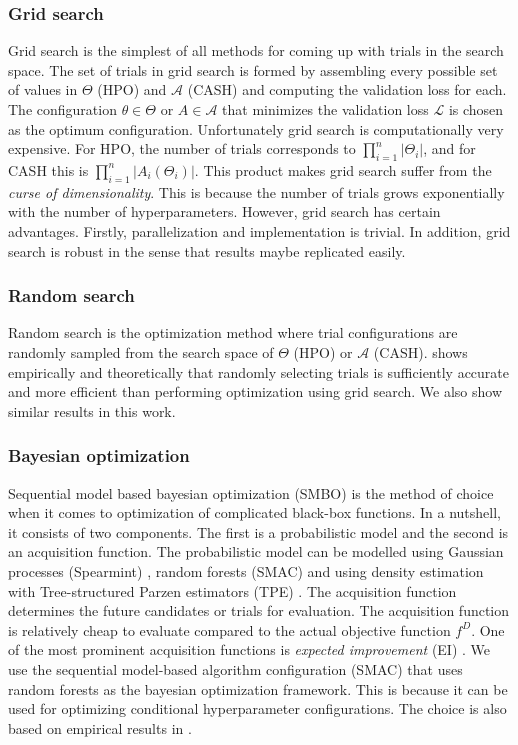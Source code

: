 \subsubsection{Grid search}
\label{grid}
Grid search is the simplest of all methods for coming up with trials in the search space. The set of trials in grid search is formed by assembling every possible set of values in $\Theta$ (HPO) and $\mathcal{A}$ (CASH) and computing the validation loss for each. The configuration $\theta \in \Theta$ or $A \in \mathcal{A}$ that minimizes the validation loss $\mathcal{L}$ is chosen as the optimum configuration. Unfortunately grid search is computationally very expensive. For HPO, the number of trials corresponds to $\prod_{i=1}^n |\Theta_i|$, and for CASH this is $\prod_{i=1}^n |A_i(\Theta_i)|$. This product makes grid search suffer from the \textit{curse of dimensionality}. This is because the number of trials grows exponentially with the number of hyperparameters. However, grid search has certain advantages. Firstly, parallelization and implementation is trivial. In addition, grid search is robust in the sense that results maybe replicated easily. 

\subsubsection{Random search}
\label{random}
Random search is the optimization method where trial configurations are randomly sampled from the search space of $\Theta$ (HPO) or $\mathcal{A}$ (CASH). \cite{bergstra2012random} shows empirically and theoretically that randomly selecting trials is sufficiently accurate and more efficient than performing optimization using grid search. We also show similar results in this work.

\subsubsection{Bayesian optimization}
\label{bayesian}
Sequential model based bayesian optimization (SMBO) \cite{hutter2011sequential} is the method of choice when it comes to optimization of complicated black-box functions. In a nutshell, it consists of two components. The first is a probabilistic model and the second is an acquisition function. The probabilistic model can be modelled using Gaussian processes (Spearmint) \cite{snoek2012practical}, random forests (SMAC) \cite{hutter2011sequential} and using density estimation with Tree-structured Parzen estimators (TPE) \cite{bergstra2011algorithms}. The acquisition function determines the future candidates or trials for evaluation. The acquisition function is relatively cheap to evaluate compared to the actual objective function $f^D$. One of the most prominent acquisition functions is \textit{expected improvement} (EI) \cite{expected_improvement}. We use the sequential model-based algorithm configuration (SMAC) that uses random forests as the bayesian optimization framework. This is because it can be used for optimizing conditional hyperparameter configurations. The choice is also based on empirical results in \cite{eggensperger2013towards}.

